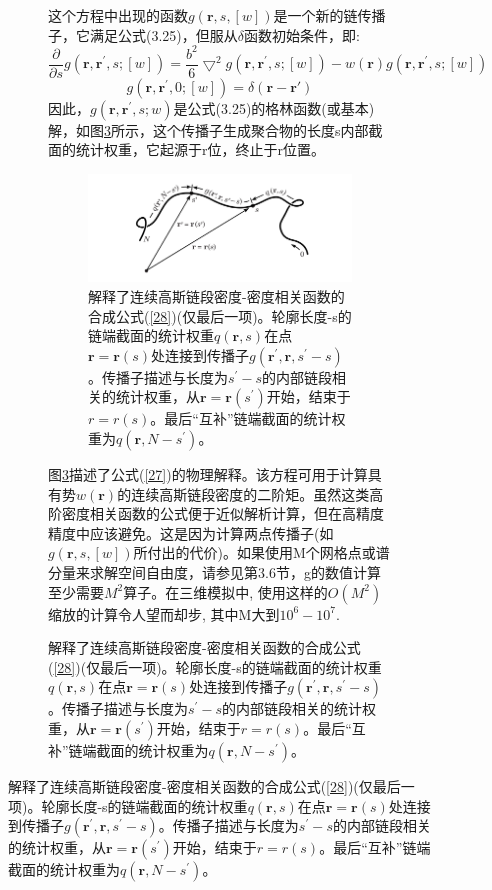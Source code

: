 \begin{figure}[H]
\begin{figure}[ht]
\begin{align}
\begin{split}
\end{split}
\end{align}
这个方程中出现的函数$g(\mathbf{r},s,[w])$是一个新的链传播子，它满足公式(3.25)，但服从$\delta$函数初始条件，即:
\begin{equation}\label{29}
\frac{\partial}{\partial s}g(\mathbf{r},\mathbf{r}^{'},s;[w])=\frac{b^2}{6}\bigtriangledown^2g(\mathbf{r},\mathbf{r}^{'},s;[w])-w(\mathbf{r})g(\mathbf{r},\mathbf{r}^{'},s;[w])
\end{equation}
\begin{equation}\label{30}
g(\mathbf{r},\mathbf{r}^{'},0;[w])=\delta(\mathbf{r}-\mathbf{r}{'})
\end{equation}
因此，$g(\mathbf{r},\mathbf{r}^{'},s;w)$是公式(3.25)的格林函数(或基本)解，如图\ref{figure2}所示，这个传播子生成聚合物的长度s内部截面的统计权重，它起源于r位，终止于r位置。
\begin{figure}[h]
\centering
\includegraphics[width=15cm]{./figures/33.png}
\caption{解释了连续高斯链段密度-密度相关函数的合成公式(\ref{28})(仅最后一项)。轮廓长度-s的链端截面的统计权重$q(\mathbf{r},s)$在点$\mathbf{r}=\mathbf{r}(s)$处连接到传播子$g(\mathbf{r}^{'},\mathbf{r},s^{'}-s)$。传播子描述与长度为$s^{'}-s$的内部链段相关的统计权重，从$\mathbf{r}=\mathbf{r}(s^{'})$开始，结束于$r=r(s)$。最后“互补”链端截面的统计权重为$q(\mathbf{r},N-s^{'})$。}
\label{figure2}
\end{figure}

图\ref{figure2}描述了公式(\ref{27})的物理解释。该方程可用于计算具有势$w(\mathbf{r})$的连续高斯链段密度的二阶矩。虽然这类高阶密度相关函数的公式便于近似解析计算，但在高精度精度中应该避免。这是因为计算两点传播子(如$g(\mathbf{r},s,[w])$所付出的代价)。如果使用M个网格点或谱分量来求解空间自由度，请参见第3.6节，g的数值计算至少需要$M^2$算子。在三维模拟中, 使用这样的$O(M^2)$缩放的计算令人望而却步, 其中M大到$10^6-10^7$.

\end{figure}
\end{figure}
